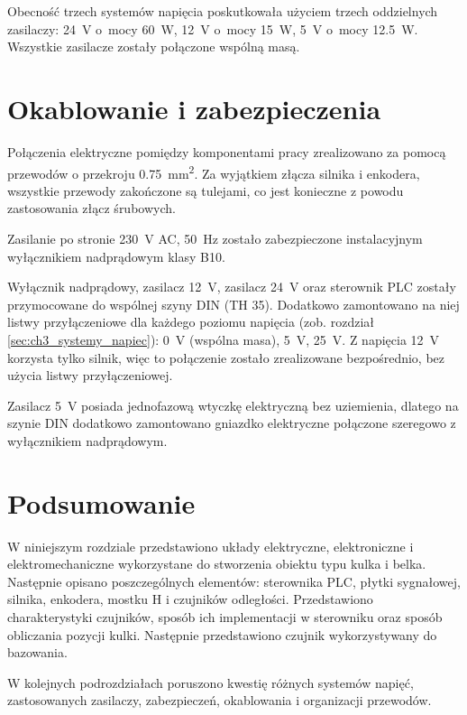 Obecność trzech systemów napięcia poskutkowała użyciem trzech oddzielnych zasilaczy: \SI{24}{\volt} o~mocy \SI{60}{\watt}, \SI{12}{\volt} o~mocy \SI{15}{\watt}, \SI{5}{\volt} o~mocy \SI{12,5}{\watt}. Wszystkie zasilacze zostały połączone wspólną masą.

\section{Okablowanie i zabezpieczenia}
\label{sec:ch3_okablowanie_zabezpieczenia}


Połączenia elektryczne pomiędzy komponentami pracy zrealizowano za pomocą przewodów o przekroju \SI{0,75}{\milli\meter\squared}. Za wyjątkiem złącza silnika i enkodera, wszystkie przewody zakończone są tulejami, co jest konieczne z powodu zastosowania złącz śrubowych.

Zasilanie po stronie \SI{230}{\volt} AC, \SI{50}{\hertz} zostało zabezpieczone instalacyjnym wyłącznikiem nadprądowym klasy B10.

Wyłącznik nadprądowy, zasilacz \SI{12}{\volt}, zasilacz \SI{24}{\volt} oraz sterownik PLC zostały przymocowane do wspólnej szyny DIN (TH \num{35}). Dodatkowo zamontowano na niej listwy przyłączeniowe dla każdego poziomu napięcia (zob. rozdział \ref{sec:ch3_systemy_napiec}): \SI{0}{\volt} (wspólna masa), \SI{5}{\volt}, \SI{25}{\volt}. Z napięcia \SI{12}{\volt} korzysta tylko silnik, więc to połączenie zostało zrealizowane bezpośrednio, bez użycia listwy przyłączeniowej.

Zasilacz \SI{5}{\volt} posiada jednofazową wtyczkę elektryczną bez uziemienia, dlatego na szynie DIN dodatkowo zamontowano gniazdko elektryczne połączone szeregowo z wyłącznikiem nadprądowym.


\section{Podsumowanie}

W niniejszym rozdziale przedstawiono układy elektryczne, elektroniczne i elektromechaniczne wykorzystane do stworzenia obiektu typu kulka i belka. Następnie opisano poszczególnych elementów: sterownika PLC, płytki sygnałowej, silnika, enkodera, mostku H i czujników odległości. Przedstawiono charakterystyki czujników, sposób ich implementacji w sterowniku oraz sposób obliczania pozycji kulki. Następnie przedstawiono czujnik wykorzystywany do bazowania.

W kolejnych podrozdziałach poruszono kwestię różnych systemów napięć, zastosowanych zasilaczy, zabezpieczeń, okablowania i organizacji przewodów.

